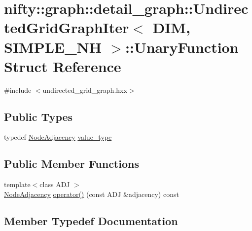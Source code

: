 \hypertarget{structnifty_1_1graph_1_1detail__graph_1_1UndirectedGridGraphIter_1_1UnaryFunction}{}\section{nifty\+:\+:graph\+:\+:detail\+\_\+graph\+:\+:Undirected\+Grid\+Graph\+Iter$<$ D\+I\+M, S\+I\+M\+P\+L\+E\+\_\+\+N\+H $>$\+:\+:Unary\+Function Struct Reference}
\label{structnifty_1_1graph_1_1detail__graph_1_1UndirectedGridGraphIter_1_1UnaryFunction}


{\ttfamily \#include $<$undirected\+\_\+grid\+\_\+graph.\+hxx$>$}

\subsection*{Public Types}
\begin{DoxyCompactItemize}
\item 
typedef \hyperlink{classnifty_1_1graph_1_1detail__graph_1_1UndirectedGridGraphIter_ab102d464df39aae71f7482baa37d8966}{Node\+Adjacency} \hyperlink{structnifty_1_1graph_1_1detail__graph_1_1UndirectedGridGraphIter_1_1UnaryFunction_a4a60979fef293486b48029f101ceaf66}{value\+\_\+type}
\end{DoxyCompactItemize}
\subsection*{Public Member Functions}
\begin{DoxyCompactItemize}
\item 
{\footnotesize template$<$class A\+D\+J $>$ }\\\hyperlink{classnifty_1_1graph_1_1detail__graph_1_1UndirectedGridGraphIter_ab102d464df39aae71f7482baa37d8966}{Node\+Adjacency} \hyperlink{structnifty_1_1graph_1_1detail__graph_1_1UndirectedGridGraphIter_1_1UnaryFunction_ad2e3b6a9e316482718cf25fef9fc7bb7}{operator()} (const A\+D\+J \&adjacency) const 
\end{DoxyCompactItemize}


\subsection{Member Typedef Documentation}
\hypertarget{structnifty_1_1graph_1_1detail__graph_1_1UndirectedGridGraphIter_1_1UnaryFunction_a4a60979fef293486b48029f101ceaf66}{}
